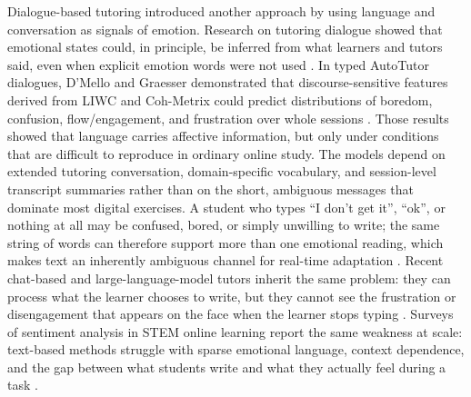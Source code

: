 Dialogue-based tutoring introduced another approach by using language and conversation as signals of emotion. Research on tutoring dialogue showed that emotional states could, in principle, be inferred from what learners and tutors said, even when explicit emotion words were not used \cite{DMello2008AutomaticDetectionLearnersAffect}. In typed \ac{AutoTutor} dialogues, D'Mello and Graesser demonstrated that discourse-sensitive features derived from \ac{LIWC} and \ac{Coh-Metrix} could predict distributions of boredom, confusion, flow/engagement, and frustration over whole sessions \cite{dmello_language_2012,Graesser2004AutoTutorDialogue}. Those results showed that language carries affective information, but only under conditions that are difficult to reproduce in ordinary online study. The models depend on extended tutoring conversation, domain-specific vocabulary, and session-level transcript summaries rather than on the short, ambiguous messages that dominate most digital exercises. A student who types ``I don't get it'', ``ok'', or nothing at all may be confused, bored, or simply unwilling to write; the same string of words can therefore support more than one emotional reading, which makes text an inherently ambiguous channel for real-time adaptation \cite{dmello_language_2012,Lavoue2017EmotionalDataCollection}. Recent chat-based and large-language-model tutors inherit the same problem: they can process what the learner chooses to write, but they cannot see the frustration or disengagement that appears on the face when the learner stops typing \cite{gutierrez_development_2025,meng_self-evolving_2025}. Surveys of sentiment analysis in STEM online learning report the same weakness at scale: text-based methods struggle with sparse emotional language, context dependence, and the gap between what students write and what they actually feel during a task \cite{anwar_emotions_2023,florestiyanto_emotion_2024}.

